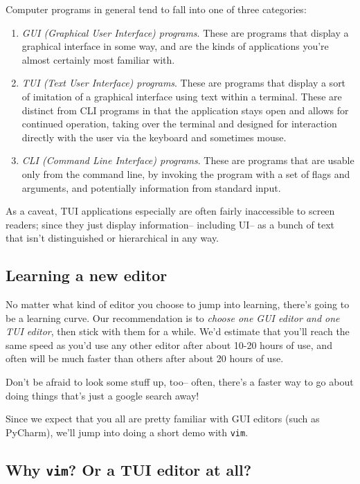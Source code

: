 Computer programs in general tend to fall into one of three categories:
\begin{enumerate}
  \item {\em GUI (Graphical User Interface) programs}. These are programs that
          display a graphical interface in some way, and are the kinds of applications
          you're almost certainly most familiar with.
  \item {\em TUI (Text User Interface) programs}. These are programs that display
          a sort of imitation of a graphical interface using text within a terminal.
          These are distinct from CLI programs in that the application stays open
          and allows for continued operation, taking over the terminal and designed
          for interaction directly with the user via the keyboard and sometimes mouse.
  \item {\em CLI (Command Line Interface) programs}. These are programs that are usable
          only from the command line, by invoking the program with a set of flags
          and arguments, and potentially information from standard input.
\end{enumerate}

As a caveat, TUI applications especially are often fairly inaccessible
to screen readers; since they just display information-- including UI--
as a bunch of text that isn't distinguished or hierarchical in any way.

\subsection{Learning a new editor}

No matter what kind of editor you choose to jump into learning, there's going
to be a learning curve. Our recommendation is to {\em choose one GUI editor
and one TUI editor}, then stick with them for a while. We'd estimate that you'll
reach the same speed as you'd use any other editor after about 10-20 hours of use,
and often will be much faster than others after about 20 hours of use.

Don't be afraid to look some stuff up, too-- often, there's a faster way to go
about doing things that's just a google search away!

Since we expect that you all are pretty familiar with GUI editors (such as 
PyCharm), we'll jump into doing a short demo with {\tt vim}.

\subsection{Why {\tt vim}? Or a TUI editor at all?}

